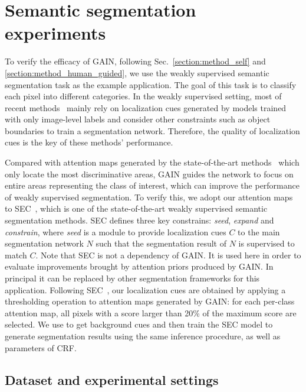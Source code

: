 \documentclass[10pt,twocolumn,letterpaper]{article}
\begin{document}
\section{Semantic segmentation experiments}\label{sc:seg_exp}

To verify the efficacy of GAIN, following Sec.~\ref{section:method_self} and \ref{section:method_human_guided}, we use the weakly supervised semantic segmentation task as the example application. The goal of this task is to classify each pixel into different categories. In the weakly supervised setting, most of recent methods~\cite{kolesnikov2016seed,kim2017two,wei2017object} mainly rely on localization cues generated by models trained with only image-level labels and consider other constraints such as object boundaries to train a segmentation network. Therefore, the quality of localization cues is the key of these methods' performance.

Compared with attention maps generated by the state-of-the-art methods~\cite{grad-cam,long2015fully,zhou2016learning} which only locate the most discriminative areas, GAIN guides the network to focus on entire areas representing the class of interest, which can improve the performance of weakly supervised segmentation. To verify this, we adopt our attention maps to SEC~\cite{kolesnikov2016seed}, which is one of the state-of-the-art weakly supervised semantic segmentation methods. SEC defines three key constrains: \emph{seed}, \emph{expand} and \emph{constrain}, where \emph{seed} is a module to provide localization cues $C$ to the main segmentation network $N$ such that the segmentation result of $N$ is supervised to match $C$. Note that SEC is not a dependency of GAIN. It is used here in order to evaluate improvements brought by attention priors produced by GAIN. In principal it can be replaced by other segmentation frameworks for this application. Following SEC~\cite{kolesnikov2016seed}, our localization cues are obtained by applying a thresholding operation to attention maps generated by GAIN: for each per-class attention map, all pixels with a score larger than 20\% of the maximum score are selected. We use \cite{liu2016dhsnet} to get background cues and then train the SEC model to generate segmentation results using the same inference procedure, as well as parameters of CRF\cite{CRFkrahenbuhl2011efficient}.
 
\subsection{Dataset and experimental settings}\label{sc:Experiment_setting}
\end{document}
